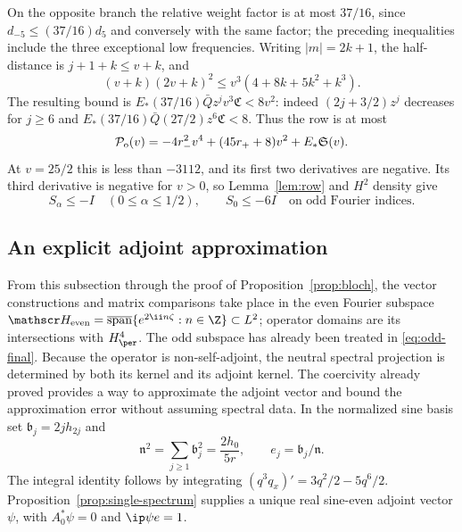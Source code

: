 On the opposite branch the relative weight factor is at most $37/16$, since $d_{-5}\le(37/16)d_5$ and conversely with the same factor; the preceding inequalities include the three exceptional low frequencies. Writing $|m|=2k+1$, the half-distance is $j+1+k\le v+k$, and
\[
 (v+k)(2v+k)^2\le v^3(4+8k+5k^2+k^3).
\]
The resulting bound is $E_*(37/16)\bar Qz^jv^3\mathfrak C<8v^2$: indeed $(2j+3/2)z^j$ decreases for $j\ge6$ and $E_*(37/16)\bar Q(27/2)z^6\mathfrak C<8$. Thus the row is at most
\begin{equation}\label{eq:odd-high}
 \mathcal P_{\rm o}(v)=-4r_-^2v^4+(45r_++8)v^2+E_*\mathfrak S(v).
\end{equation}
At $v=25/2$ this is less than $-3112$, and its first two derivatives are negative. Its third derivative is negative for $v>0$, so Lemma~\ref{lem:row} and $H^2$ density give
\begin{equation}\label{eq:odd-final}
 S_\alpha\le-I\quad(0\le\alpha\le1/2),\qquad S_0\le-6I
 \quad\text{on odd Fourier indices}.
\end{equation}

\subsection{An explicit adjoint approximation}
From this subsection through the proof of Proposition~\ref{prop:bloch}, the vector constructions and matrix comparisons take place in the even Fourier subspace $\mathscr H_{\rm even}=\overline{\operatorname{span}}\{e^{2\ii n\zeta}:n\in\Z\}\subset L^2$; operator domains are its intersections with $H^4_\per$. The odd subspace has already been treated in \eqref{eq:odd-final}. Because the operator is non-self-adjoint, the neutral spectral projection is determined by both its kernel and its adjoint kernel. The coercivity already proved provides a way to approximate the adjoint vector and bound the approximation error without assuming spectral data.
In the normalized sine basis set $\mathfrak b_j=2jh_{2j}$ and
\begin{equation}\label{eq:kernel-norm}
 \mathfrak n^2=\sum_{j\ge1}\mathfrak b_j^2=\frac{2h_0}{5r},\qquad
 e_j=\mathfrak b_j/\mathfrak n.
\end{equation}
The integral identity follows by integrating $(q^3q_x)'=3q^2/2-5q^6/2$. Proposition~\ref{prop:single-spectrum} supplies a unique real sine-even adjoint vector $\psi$, with $A_0^*\psi=0$ and $\ip\psi e=1$.

